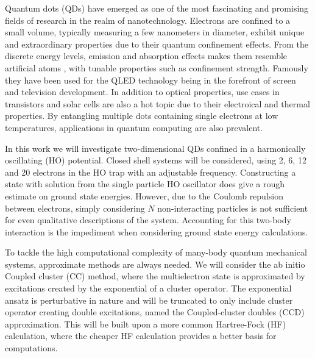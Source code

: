 Quantum dots (QDs) have emerged as one of the most fascinating and promising fields of research in the realm of nanotechnology. Electrons are confined to a small volume, typically measuring a few nanometers in diameter, exhibit unique and extraordinary properties due to their quantum confinement effects. From the discrete energy levels, emission and absorption effects makes them resemble artificial atoms \citep{atomlike}, with tunable properties such as confinement strength. Famously they have been used for the QLED technology \citep{QLED} being in the forefront of screen and television development. In addition to optical properties, use cases in transistors and solar cells are also a hot topic due to their electroical and thermal properties. By entangling multiple dots containing single electrons at low temperatures, applications in quantum computing are also prevalent.

In this work we will investigate two-dimensional QDs confined in a harmonically oscillating (HO) potential. Closed shell systems will be considered, using 2, 6, 12 and 20 electrons in the HO trap with an adjustable frequency. Constructing a state with solution from the single particle HO oscillator does give a rough estimate on ground state energies. However, due to the Coulomb repulsion between electrons, simply considering $N$ non-interacting particles is not sufficient for even qualitative descriptions of the system. Accounting for this two-body interaction is the impediment when considering ground state energy calculations.

To tackle the high computational complexity of many-body quantum mechanical systems, approximate methods are always needed. We will consider the ab initio Coupled cluster (CC) method, where the multielectron state is approximated by excitations created by the exponential of a cluster operator. The exponential ansatz is perturbative in nature and will be truncated to only include cluster operator creating double excitations, named the Coupled-cluster doubles (CCD) approximation. This will be built upon a more common Hartree-Fock (HF) calculation, where the cheaper HF calculation provides a better basis for computations.
